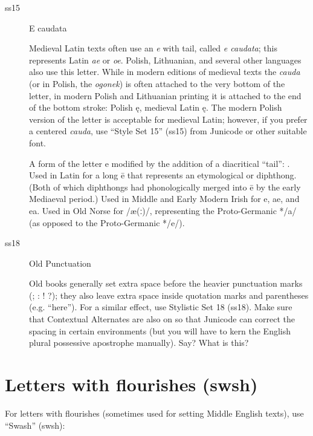 \begin{description}
\item[ss15] E caudata 

Medieval Latin texts often use an {\itshape e} with tail, called
{\itshape e caudata}; this represents Latin {\itshape ae} or {\itshape
  oe}. Polish, Lithuanian, and several other languages also use this
letter. While in modern editions of medieval texts the {\itshape
  cauda} (or in Polish, the {\itshape ogonek}) is often attached to
the very bottom of the letter, in modern Polish and Lithuanian
printing it is attached to the end of the bottom stroke: Polish ę,
medieval Latin {ę}. The modern
Polish version of the letter is acceptable for medieval Latin;
however, if you prefer a centered {\itshape cauda}, use
“Style Set 15” (ss15) from Junicode or other suitable font.

A form of the letter e modified by the addition of a diacritical “tail”: .
Used in Latin for a long ē that represents an etymological  or  diphthong. (Both of which diphthongs had phonologically merged into ē by the early Mediaeval period.)
Used in Middle and Early Modern Irish for e, ae, and ea.
Used in Old Norse for /æ(ː)/, representing the Proto-Germanic */a/ (as opposed to the Proto-Germanic */e/).

\item [ss18] Old Punctuation

{


Old books generally set
extra space before the heavier punctuation marks (; : ! ?);
they also leave extra space inside quotation marks and
parentheses (e.g. “here”). For a similar effect, use Stylistic Set 18 (ss18). Make sure
that Contextual Alternates are also on so that Junicode can correct
the spacing in certain environments (but you will have to kern the English plural
possessive apostrophe manually). Say? What is this?

}

\end{description}

\section*{Letters with flourishes (swsh)}
For letters with flourishes (sometimes used for setting Middle English
texts), use “Swash” (swsh):


